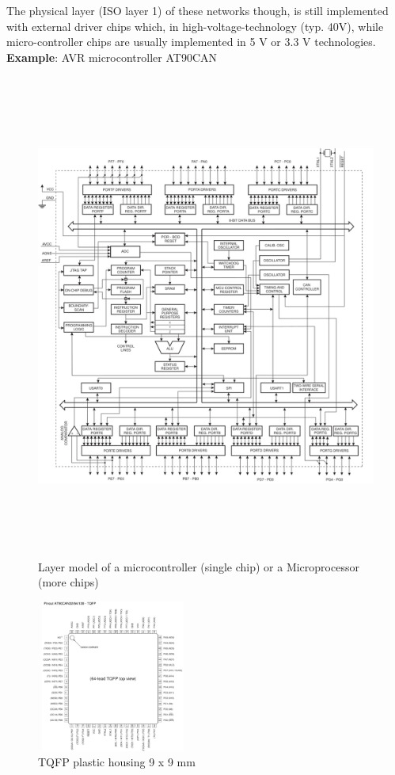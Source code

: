 The physical layer (ISO layer 1) of these networks though, is still implemented with external driver chips which, in high-voltage-technology (typ. 40V), while micro-controller chips are usually implemented in 5 V or 3.3 V technologies.\\

\textbf{Example}: AVR microcontroller AT90CAN

    \begin{figure}[h]
    \centering
    \includegraphics[width=15cm, height=16cm]{Images/image29.png}
    \caption{Layer model of a microcontroller (single chip) or a Microprocessor (more chips)}
    \label{fig:Fig 113}
    \end{figure}
    
    \begin{figure}[h]
    \centering
    \includegraphics[width=5cm, height=5cm]{Images/image161.png}
    \caption{TQFP plastic housing 9 x 9 mm}
    \label{fig:Fig 114}
    \end{figure}

